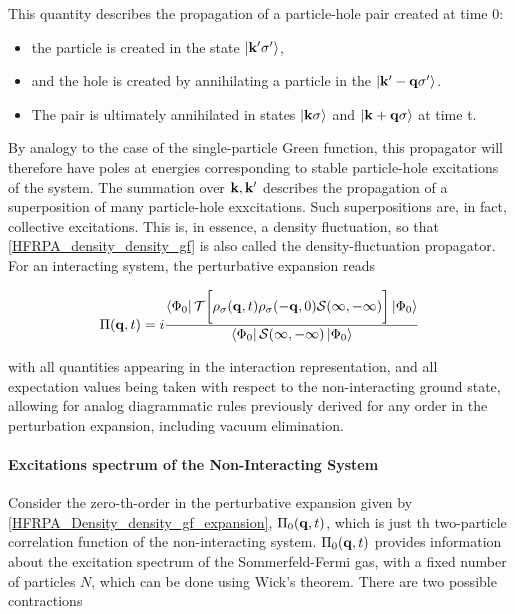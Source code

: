 \documentclass{homework}
\begin{document}
This quantity describes the propagation of a particle-hole pair created at time 0: 

\begin{itemize}
    \item the particle is created in the state $\ket{{\bf k'} \sigma'}$,
    \item and the hole is created by annihilating a particle in the $\ket{{\bf k' - q} \sigma'}$.
    \item The pair is ultimately annihilated in states $\ket{{\bf k} \sigma}$ and $\ket{{\bf k +q} \sigma}$ at time t. 
\end{itemize}

By analogy to the case of the single-particle Green function, this propagator will therefore have poles at energies corresponding to stable particle-hole excitations of the system. The summation over ${\bf k}, {\bf k'}$ describes the propagation of a superposition of many particle-hole exxcitations. Such superpositions are, in fact, collective excitations. This is, in essence, a density fluctuation, so that \cref{HFRPA_density_density_gf} is also called the density-fluctuation propagator. For an interacting system, the perturbative expansion reads

\begin{equation}
    \Pi({\bf q},t) = i \frac{\bra{\Phi_0} \mathcal{T} \bigg[ \rho_{\sigma}({\bf q},t) \rho_{\sigma}(-{\bf q},0)\mathcal{S}(\infty, -\infty) \bigg] \ket{\Phi_0}}{\bra{\Phi_0} \mathcal{S}(\infty, -\infty) \ket{\Phi_0}}
    \label{HFRPA_Density_density_gf_expansion}
\end{equation}

with all quantities appearing in the interaction representation, and all expectation values being taken with respect to the non-interacting ground state, allowing for analog diagrammatic rules previously derived for any order in the perturbation expansion, including vacuum elimination. \\

\paragraph{Excitations spectrum of the Non-Interacting System}

Consider the zero-th-order in the perturbative expansion given by \cref{HFRPA_Density_density_gf_expansion}, $\Pi_0({\bf q}, t)$, which is just th two-particle correlation function of the non-interacting system. $\Pi_0({\bf q}, t)$ provides information about the excitation spectrum of the Sommerfeld-Fermi gas, with a fixed number of particles $N$, which can be done using Wick's theorem. There are two possible contractions 
\end{document}
